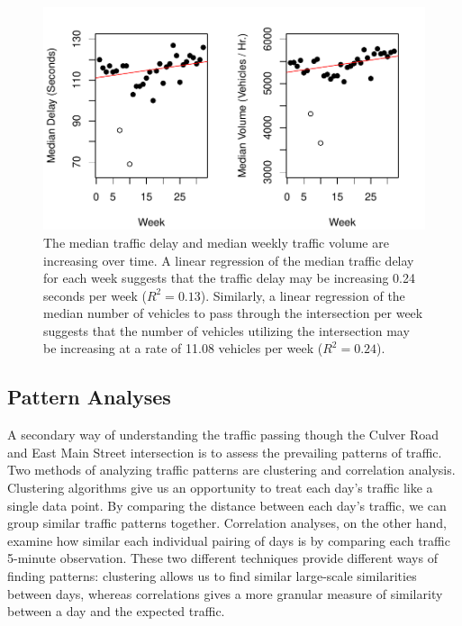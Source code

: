 \documentclass{report}
\begin{document}
\begin{figure}[H]
\centering

\includegraphics{upstat_report-VolumePlot}
\caption{The median traffic delay and median weekly
traffic volume are increasing over time. A linear regression of the median
traffic delay for each week suggests that the traffic delay may be increasing
0.24 seconds per week
($R^2 = 0.13$). Similarly, a linear
regression of the median number of vehicles to pass through the intersection per
week suggests that the number of vehicles utilizing the intersection may be
increasing at a rate of 11.08 vehicles
per week ($R^2 = 0.24$).}
\label{trends}
\end{figure}

\subsection*{Pattern Analyses}

A secondary way of understanding the traffic passing though the Culver Road and
East Main Street intersection is to assess the prevailing patterns of traffic.
Two methods of analyzing traffic patterns are clustering and correlation analysis.
Clustering algorithms give us an opportunity to treat each day's traffic like
a single data point. By comparing the distance between each day's traffic, we can
group similar traffic patterns together. Correlation analyses, on the other hand,
examine how similar each individual pairing of days is by comparing each traffic
5-minute observation. These two different techniques provide different ways of
finding patterns: clustering allows us to find similar large-scale similarities
between days, whereas correlations gives a more granular measure of similarity
between a day and the expected traffic.
\end{document}
